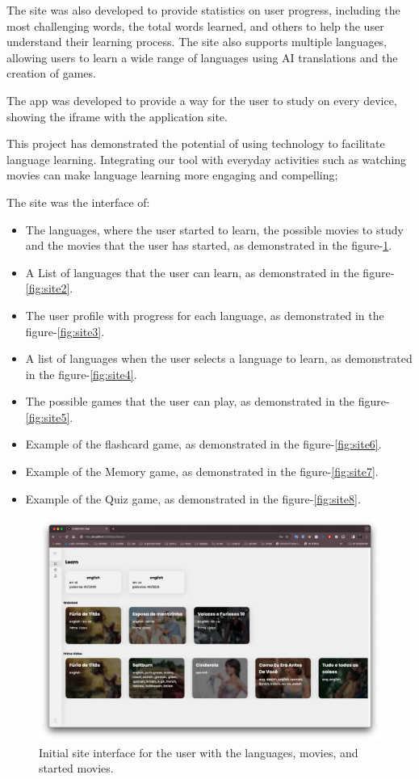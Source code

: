 \documentclass[12pt]{article}
\begin{document}
The site was also developed to provide statistics on user progress, including the most challenging words, the total words learned, and others to help the user understand their learning process. The site also supports multiple languages, allowing users to learn a wide range of languages using AI translations and the creation of games. 

The app was developed to provide a way for the user to study on every device, showing the iframe with the application site.

This project has demonstrated the potential of using technology to facilitate language learning. Integrating our tool with everyday activities such as watching movies can make language learning more engaging and compelling; 

The site was the interface of:

\begin{itemize}
\item The languages, where the user started to learn, the possible movies to study and the movies that the user has started, as demonstrated in the figure-\ref{fig:site1}.
\item A List of languages that the user can learn, as demonstrated in the figure-\ref{fig:site2}.
\item The user profile with progress for each language, as demonstrated in the figure-\ref{fig:site3}.
\item A list of languages when the user selects a language to learn, as demonstrated in the figure-\ref{fig:site4}.
\item The possible games that the user can play, as demonstrated in the figure-\ref{fig:site5}.
\item Example of the flashcard game, as demonstrated in the figure-\ref{fig:site6}.
\item Example of the Memory game, as demonstrated in the figure-\ref{fig:site7}.
\item Example of the Quiz game, as demonstrated in the figure-\ref{fig:site8}.
\end{itemize}

\begin{figure}
  \centering
  \caption{
  Initial site interface for the user with the languages, movies, and started movies.
  }
  \label{fig:site1}
  \includegraphics[width=1\textwidth]{assets/20.png}
  \end{figure}
\end{document}
